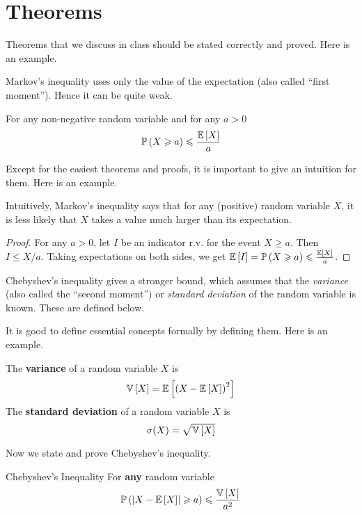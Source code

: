 \section{Theorems}



Theorems that we discuss in class should be stated correctly and proved. Here is an example.

\bigskip

Markov's inequality uses only the value of the expectation (also called ``first moment'').
Hence it can be quite weak.

\begin{theorem}
    For any non-negative random variable and for any $a > 0$
    \[\operatorname{\mathbb{P}}\left(X\geqslant a\right)\leqslant \frac{\operatorname{\mathbb{E}}\left[X\right]}{a}\]
\end{theorem}


Except for the easiest theorems and proofs, it is important to give an intuition for them.
Here is an example.

Intuitively, Markov's inequality says that for any (positive) random variable $X$, it is less likely  that
$X$ takes a value  much larger than its expectation. 



\begin{proof}
    For any $a > 0$, let
    $I$ be an indicator r.v. for the event  $X \geq a$.
    Then $I \leq X/a$. Taking expectations on both sides, we get   $\operatorname{\mathbb{E}}\left[I\right] = \operatorname{\mathbb{P}}\left(X \geqslant a\right) \leqslant \frac{\operatorname{\mathbb{E}}\left[X\right]}{a}$.
\end{proof}



Chebyshev's inequality gives a stronger bound, which  assumes that the \emph{variance} (also called the ``second moment'') or \emph{standard deviation} of the random variable is known.
These are defined below.


It is good to define essential concepts formally by defining them. Here is an example.

\begin{definition}
    The \textbf{variance} of a random variable $X$ is
    \[\operatorname{\mathbb{V}}\left[X\right] = \operatorname{\mathbb{E}}\left[\left(X-\operatorname{\mathbb{E}}\left[X\right]\right)^2\right]\]
    The \textbf{standard deviation} of a random variable $X$ is
    \[\sigma(X)=\sqrt{\operatorname{\mathbb{V}}\left[X\right]}\]
\end{definition}

Now we state and prove Chebyshev's inequality.

\begin{theorem}{Chebyshev's Inequality}
    For \textbf{any} random variable
    \[\operatorname{\mathbb{P}}\left(\left\lvert X-\operatorname{\mathbb{E}}\left[X\right]\right\rvert \geqslant a\right) \leqslant \frac{\operatorname{\mathbb{V}}\left[X\right]}{a^2}\]
\end{theorem}

